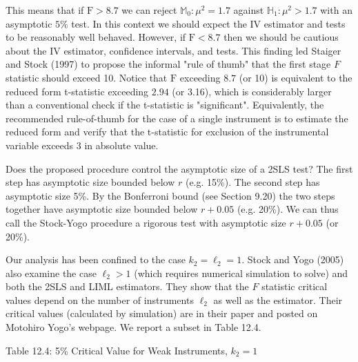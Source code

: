 \documentclass[10pt]{article}
\begin{document}
This means that if $\mathrm{F}>8.7$ we can reject $\mathbb{M}_{0}: \mu^{2}=1.7$ against $\mathbb{H}_{1}: \mu^{2}>1.7$ with an asymptotic $5 \%$ test. In this context we should expect the IV estimator and tests to be reasonably well behaved. However, if $\mathrm{F}<8.7$ then we should be cautious about the IV estimator, confidence intervals, and tests. This finding led Staiger and Stock (1997) to propose the informal "rule of thumb" that the first stage $F$ statistic should exceed 10. Notice that $\mathrm{F}$ exceeding $8.7$ (or 10) is equivalent to the reduced form t-statistic exceeding $2.94$ (or 3.16), which is considerably larger than a conventional check if the t-statistic is "significant". Equivalently, the recommended rule-of-thumb for the case of a single instrument is to estimate the reduced form and verify that the t-statistic for exclusion of the instrumental variable exceeds 3 in absolute value.

Does the proposed procedure control the asymptotic size of a 2SLS test? The first step has asymptotic size bounded below $r$ (e.g. 15\%). The second step has asymptotic size 5\%. By the Bonferroni bound (see Section 9.20) the two steps together have asymptotic size bounded below $r+0.05$ (e.g. 20\%). We can thus call the Stock-Yogo procedure a rigorous test with asymptotic size $r+0.05$ (or 20\%).

Our analysis has been confined to the case $k_{2}=\ell_{2}=1$. Stock and Yogo (2005) also examine the case $\ell_{2}>1$ (which requires numerical simulation to solve) and both the 2SLS and LIML estimators. They show that the $F$ statistic critical values depend on the number of instruments $\ell_{2}$ as well as the estimator. Their critical values (calculated by simulation) are in their paper and posted on Motohiro Yogo's webpage. We report a subset in Table 12.4.

Table 12.4: 5\% Critical Value for Weak Instruments, $k_{2}=1$
\end{document}
